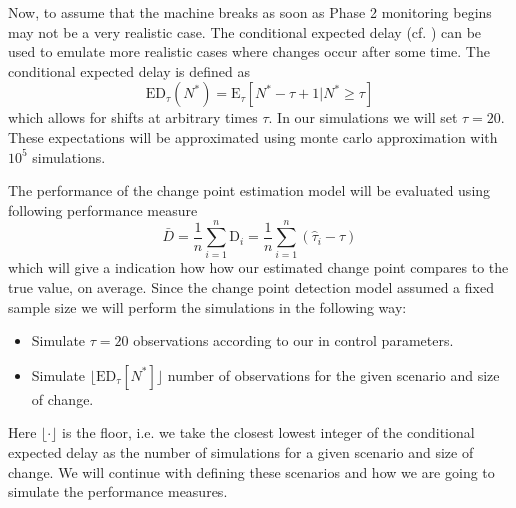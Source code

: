\documentclass[a4paper,11pt,fleqn,twoside,notitlepage]{report}
\begin{document}
Now, to assume that the machine breaks as soon as Phase 2 monitoring begins may not be a very realistic case. The conditional expected delay (cf. \cite{ED}) can be used to emulate more realistic cases where changes occur after some time. The conditional expected delay is defined as 
$$
\text{ED}_{\tau}(N^*) = \text{E}_{\tau}[N^*-\tau+1|N^*\geq \tau]
$$
which allows for shifts at arbitrary times $\tau$. In our simulations we will set $\tau=20$. These expectations will be approximated using monte carlo approximation with $10^5$ simulations.

The performance of the change point estimation model will be evaluated using following performance measure
$$
\bar{D}=\frac{1}{n}\sum_{i=1}^n \text{D}_i=\frac{1}{n}\sum_{i=1}^n \left(\hat{\tau}_i-\tau \right)
$$
which will give a indication how how our estimated change point compares to the true value, on average. Since the change point detection model assumed a fixed sample size we will perform the simulations in the following way: 
\begin{itemize}
\item Simulate $\tau=20$ observations according to our in control parameters.
\item Simulate $\lfloor \text{ED}_{\tau}[N^*] \rfloor$ number of observations for the given scenario and size of change. 
\end{itemize}
Here $\lfloor \cdot \rfloor$ is the floor, i.e. we take the closest lowest integer of the conditional expected delay as the number of simulations for a given scenario and size of change. We will continue with defining these scenarios and how we are going to simulate the performance measures.
\end{document}
